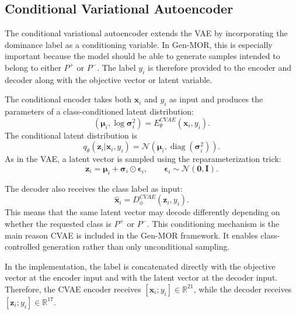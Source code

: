 \subsection{Conditional Variational Autoencoder}
\label{subsec:cvae}

The conditional variational autoencoder extends the VAE by incorporating the dominance label as a conditioning variable. In Gen-MOR, this is especially important because the model should be able to generate samples intended to belong to either $P^{+}$ or $P^{-}$. The label $y_i$ is therefore provided to the encoder and decoder along with the objective vector or latent variable.

The conditional encoder takes both $\mathbf{x}_i$ and $y_i$ as input and produces the parameters of a class-conditioned latent distribution:
\begin{equation}
    (\boldsymbol{\mu}_i, \log \boldsymbol{\sigma}_i^{2})
    =
    E_{\theta}^{CVAE}(\mathbf{x}_i, y_i).
    \label{eq:cvae_encoder_params}
\end{equation}
The conditional latent distribution is
\begin{equation}
    q_{\theta}(\mathbf{z}_i|\mathbf{x}_i,y_i)
    =
    \mathcal{N}
    \left(
        \boldsymbol{\mu}_i,
        \operatorname{diag}(\boldsymbol{\sigma}_i^{2})
    \right).
    \label{eq:cvae_latent_distribution}
\end{equation}
As in the VAE, a latent vector is sampled using the reparameterization trick:
\begin{equation}
    \mathbf{z}_i
    =
    \boldsymbol{\mu}_i
    +
    \boldsymbol{\sigma}_i \odot \boldsymbol{\epsilon}_i,
    \qquad
    \boldsymbol{\epsilon}_i \sim \mathcal{N}(\mathbf{0}, \mathbf{I}).
    \label{eq:cvae_reparameterization}
\end{equation}

The decoder also receives the class label as input:
\begin{equation}
    \hat{\mathbf{x}}_i
    =
    D_{\phi}^{CVAE}(\mathbf{z}_i, y_i).
    \label{eq:cvae_decoder}
\end{equation}
This means that the same latent vector may decode differently depending on whether the requested class is $P^{+}$ or $P^{-}$. This conditioning mechanism is the main reason CVAE is included in the Gen-MOR framework. It enables class-controlled generation rather than only unconditional sampling.

In the implementation, the label is concatenated directly with the objective vector at the encoder input and with the latent vector at the decoder input. Therefore, the CVAE encoder receives $[\mathbf{x}_i;y_i] \in \mathbb{R}^{21}$, while the decoder receives $[\mathbf{z}_i;y_i] \in \mathbb{R}^{17}$.

